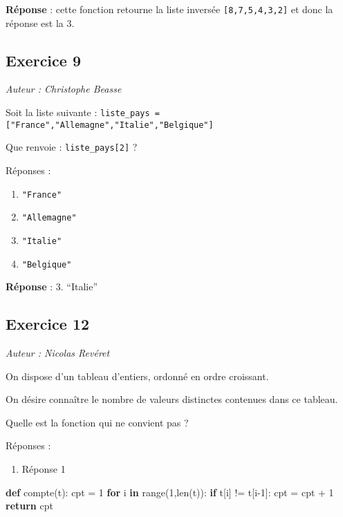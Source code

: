\documentclass[11pt]{article}
\providecommand{\tightlist}{%
      \setlength{\itemsep}{0pt}\setlength{\parskip}{0pt}}
\newenvironment{Shaded}{}{}
\newcommand{\KeywordTok}[1]{\textcolor[rgb]{0.00,0.44,0.13}{\textbf{{#1}}}}
\newcommand{\DecValTok}[1]{\textcolor[rgb]{0.25,0.63,0.44}{{#1}}}
\newcommand{\NormalTok}[1]{{#1}}
\newcommand{\ControlFlowTok}[1]{\textcolor[rgb]{0.00,0.44,0.13}{\textbf{{#1}}}}
\newcommand{\OperatorTok}[1]{\textcolor[rgb]{0.40,0.40,0.40}{{#1}}}
\newcommand{\BuiltInTok}[1]{{#1}}
\begin{document}
    \textbf{Réponse} : cette fonction retourne la liste inversée
\texttt{{[}8,7,5,4,3,2{]}} et donc la réponse est la 3.

    \hypertarget{exercice-9}{%
\subsection{Exercice 9}\label{exercice-9}}

\emph{Auteur : Christophe Beasse}

Soit la liste suivante :
\texttt{liste\_pays\ ={[}"France","Allemagne","Italie","Belgique"{]}}

Que renvoie : \texttt{liste\_pays{[}2{]}} ?

Réponses :

\begin{enumerate}
\def\labelenumi{\arabic{enumi}.}
\tightlist
\item
  \texttt{"France"}
\item
  \texttt{"Allemagne"}
\item
  \texttt{"Italie"}
\item
  \texttt{"Belgique"}
\end{enumerate}

    \textbf{Réponse} : 3. ``Italie''

    \hypertarget{exercice-12}{%
\subsection{Exercice 12}\label{exercice-12}}

\emph{Auteur : Nicolas Revéret}

On dispose d'un tableau d'entiers, ordonné en ordre croissant.

On désire connaître le nombre de valeurs distinctes contenues dans ce
tableau.

Quelle est la fonction qui ne convient pas ?

Réponses :

\begin{enumerate}
\def\labelenumi{\arabic{enumi}.}
\tightlist
\item
  Réponse 1
\end{enumerate}

\begin{Shaded}
\begin{Highlighting}[]
\KeywordTok{def}\NormalTok{ compte(t):}
\NormalTok{    cpt }\OperatorTok{=} \DecValTok{1}
    \ControlFlowTok{for}\NormalTok{ i }\KeywordTok{in} \BuiltInTok{range}\NormalTok{(}\DecValTok{1}\NormalTok{,}\BuiltInTok{len}\NormalTok{(t)):}
        \ControlFlowTok{if}\NormalTok{ t[i] }\OperatorTok{!=}\NormalTok{ t[i}\DecValTok{{-}1}\NormalTok{]:}
\NormalTok{            cpt }\OperatorTok{=}\NormalTok{ cpt }\OperatorTok{+} \DecValTok{1}
    \ControlFlowTok{return}\NormalTok{ cpt}
\end{Highlighting}
\end{Shaded}
\end{document}
